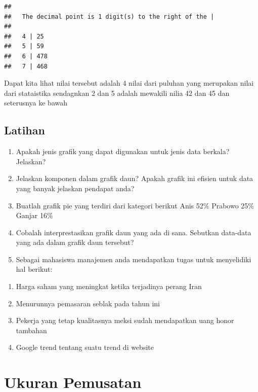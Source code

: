 \documentclass[
]{book}
\providecommand{\tightlist}{%
  \setlength{\itemsep}{0pt}\setlength{\parskip}{0pt}}
\theoremstyle{definition}
\theoremstyle{definition}
\theoremstyle{definition}
\theoremstyle{definition}
\theoremstyle{remark}
\begin{document}
\begin{verbatim}
## 
##   The decimal point is 1 digit(s) to the right of the |
## 
##   4 | 25
##   5 | 59
##   6 | 478
##   7 | 468
\end{verbatim}

Dapat kita lihat nilai tersebut adalah 4 nilai dari puluhan yang merupakan nilai dari stataistika sendagnkan 2 dan 5 adalah mewakili nilia 42 dan 45 dan seterusnya ke bawah

\hypertarget{latihan}{%
\section*{Latihan}\label{latihan}}

\begin{enumerate}
\def\labelenumi{\arabic{enumi}.}
\tightlist
\item
  Apakah jenis grafik yang dapat digunakan untuk jenis data berkala? Jelaskan?
\item
  Jelaskan komponen dalam grafik daun? Apakah grafik ini efisien untuk data yang banyak jelaskan pendapat anda?
\item
  Buatlah grafik pie yang terdiri dari kategori berikut
  Anis 52\%
  Prabowo 25\%
  Ganjar 16\%
\item
  Cobalah interprestasikan grafik daun yang ada di sana. Sebutkan data-data yang ada dalam grafik daun tersebut?
\item
  Sebagai mahasiswa manajemen anda mendapatkan tugas untuk menyelidiki hal berikut:
\end{enumerate}

\begin{enumerate}
\def\labelenumi{\alph{enumi}.}
\tightlist
\item
  Harga saham yang meningkat ketika terjadinya perang Iran
\item
  Menurunnya pemasaran seblak pada tahun ini
\item
  Pekerja yang tetap kualitasnya meksi sudah mendapatkan uang honor tambahan
\item
  Google trend tentang suatu trend di website
\end{enumerate}

\hypertarget{ukuran-pemusatan}{%
\chapter{Ukuran Pemusatan}\label{ukuran-pemusatan}}
\end{document}
